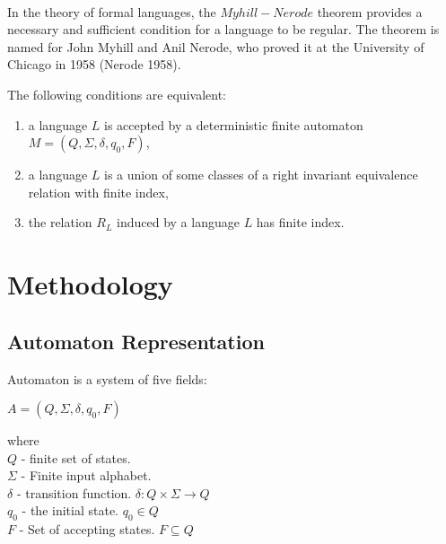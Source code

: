 \documentclass[runningheads,a4paper]{llncs}
\begin{document}
\paragraph{}
In the theory of formal languages, the $Myhill-Nerode$ theorem provides a necessary and sufficient condition for a language to be regular. The theorem is named for John Myhill and Anil Nerode, who proved it at the University of Chicago in 1958 (Nerode 1958).

\begin{theorem}
The following conditions are equivalent:
\begin{enumerate}
\item a language $L$ is accepted by a deterministic finite automaton $M = (Q,\Sigma,\delta,q_0,F)$,
\item a language $L$ is a union of some classes of a right invariant equivalence relation with finite index,
\item the relation $R_{L}$ induced by a language $L$ has finite index.
\end{enumerate}
\end{theorem}




\section{Methodology} \label{section:methodology}

\subsection{Automaton Representation} \label{sec:autom}

Automaton is a system of five fields:
\begin{center}
	$A = (Q, \Sigma, \delta, q_0, F)$
\end{center}

where \\
$Q$ - finite set of states. \\
$\Sigma$ - Finite input alphabet. \\
$\delta$ - transition function. $\delta: Q \times \Sigma \rightarrow Q$ \\
$q_0$ - the initial state. $q_0 \in Q$ \\
$F$ - Set of accepting states. $F \subseteq Q$ \\
\end{document}
